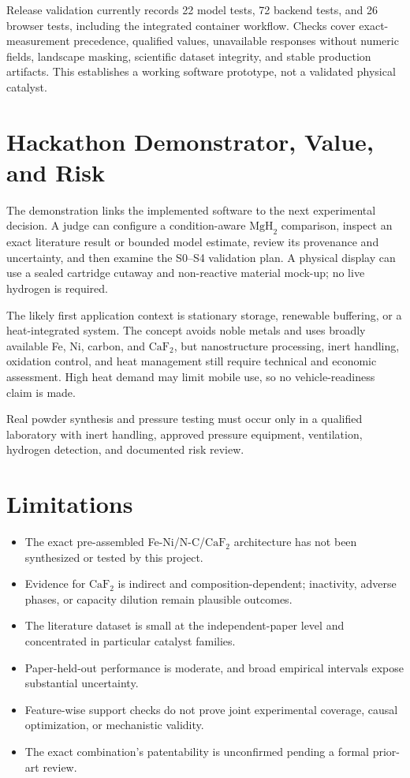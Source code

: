 \documentclass[11pt,a4paper]{article}
\newcommand{\MgHtwo}{\ensuremath{\mathrm{MgH}_{2}}}
\newcommand{\CaFtwo}{\ensuremath{\mathrm{CaF}_{2}}}
\begin{document}
Release validation currently records 22 model tests, 72 backend tests, and 26 browser tests, including the integrated container workflow. Checks cover exact-measurement precedence, qualified values, unavailable responses without numeric fields, landscape masking, scientific dataset integrity, and stable production artifacts. This establishes a working software prototype, not a validated physical catalyst.

\section{Hackathon Demonstrator, Value, and Risk}

The demonstration links the implemented software to the next experimental decision. A judge can configure a condition-aware \MgHtwo{} comparison, inspect an exact literature result or bounded model estimate, review its provenance and uncertainty, and then examine the S0--S4 validation plan. A physical display can use a sealed cartridge cutaway and non-reactive material mock-up; no live hydrogen is required.

The likely first application context is stationary storage, renewable buffering, or a heat-integrated system. The concept avoids noble metals and uses broadly available Fe, Ni, carbon, and \CaFtwo{}, but nanostructure processing, inert handling, oxidation control, and heat management still require technical and economic assessment. High heat demand may limit mobile use, so no vehicle-readiness claim is made.

Real powder synthesis and pressure testing must occur only in a qualified laboratory with inert handling, approved pressure equipment, ventilation, hydrogen detection, and documented risk review.

\section{Limitations}

\begin{itemize}
  \item The exact pre-assembled Fe-Ni/N-C/\CaFtwo{} architecture has not been synthesized or tested by this project.
  \item Evidence for \CaFtwo{} is indirect and composition-dependent; inactivity, adverse phases, or capacity dilution remain plausible outcomes.
  \item The literature dataset is small at the independent-paper level and concentrated in particular catalyst families.
  \item Paper-held-out performance is moderate, and broad empirical intervals expose substantial uncertainty.
  \item Feature-wise support checks do not prove joint experimental coverage, causal optimization, or mechanistic validity.
  \item The exact combination's patentability is unconfirmed pending a formal prior-art review.
\end{itemize}
\end{document}
